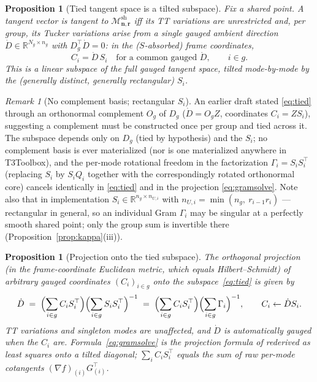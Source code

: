 \documentclass[11pt]{article}
\newtheorem{proposition}[theorem]{Proposition}
\theoremstyle{definition}
\theoremstyle{remark}
\newtheorem{remark}[theorem]{Remark}
\newcommand{\R}{\mathbb{R}}
\newcommand{\Msh}{\mathcal{M}^{\mathrm{sh}}_{\boldsymbol{n},\boldsymbol{r}}}
\begin{document}
\begin{proposition}[Tied tangent space is a tilted subspace]\label{prop:tilt}
Fix a shared point. A tangent vector is tangent to $\Msh$ iff its TT
variations are unrestricted and, per group, its Tucker variations arise from
a single \emph{gauged ambient direction} $\dot D \in \R^{N_g \times n_g}$
with $D_g^\top \dot D = 0$: in the ($S$-absorbed) frame coordinates,
\begin{equation}\label{eq:tied}
C_i = \dot D\, S_i \quad \text{for a common gauged } \dot D, \qquad i \in g .
\end{equation}
This is a linear subspace of the full gauged tangent space, tilted
mode-by-mode by the (generally distinct, generally rectangular) $S_i$.
\end{proposition}

\begin{remark}[No complement basis; rectangular $S_i$]
An earlier draft stated \eqref{eq:tied} through an orthonormal complement
$O_g$ of $D_g$ ($\dot D = O_g Z$, coordinates $C_i = Z S_i$), suggesting a
complement must be constructed once per group and tied across it. The
subspace depends only on $D_g$ (tied by hypothesis) and the $S_i$; no
complement basis is ever materialized (nor is one materialized anywhere in
T3Toolbox), and the per-mode rotational freedom in the factorization
$\Gamma_i = S_i S_i^\top$ (replacing $S_i$ by $S_i Q_i$ together with the
correspondingly rotated orthonormal core) cancels identically in
\eqref{eq:tied} and in the projection \eqref{eq:gramsolve}. Note also that in
implementation $S_i \in \R^{n_g \times n_{U,i}}$ with
$n_{U,i} = \min(n_g,\ r_{i-1} r_i)$ --- rectangular in general, so an
individual Gram $\Gamma_i$ may be singular at a perfectly smooth shared
point; only the group sum is invertible there
(Proposition~\ref{prop:kappa}(iii)).
\end{remark}

\begin{proposition}[Projection onto the tied subspace]\label{prop:proj}
The orthogonal projection (in the frame-coordinate Euclidean metric, which
equals Hilbert--Schmidt) of arbitrary gauged coordinates
$(C_{i})_{i \in g}$ onto the subspace~\eqref{eq:tied} is given by
\begin{equation}\label{eq:gramsolve}
\dot D \;=\; \Bigl(\sum_{i \in g} C_i S_i^\top\Bigr)
        \Bigl(\sum_{i \in g} S_i S_i^\top\Bigr)^{-1}
   \;=\; \Bigl(\sum_{i \in g} C_i S_i^\top\Bigr)
        \Bigl(\sum_{i \in g} \Gamma_i\Bigr)^{-1},
\qquad
C_i \leftarrow \dot D S_i .
\end{equation}
TT variations and singleton modes are unaffected, and $\dot D$ is
automatically gauged when the $C_i$ are. Formula~\eqref{eq:gramsolve}
is the projection formula of \cite[\S 5.3]{MR2026} rederived as least squares
onto a tilted diagonal; $\sum_i C_i S_i^\top$ equals the sum of raw per-mode
cotangents $(\nabla f)_{(i)} G_{(i)}^\top$.
\end{proposition}
\end{document}
